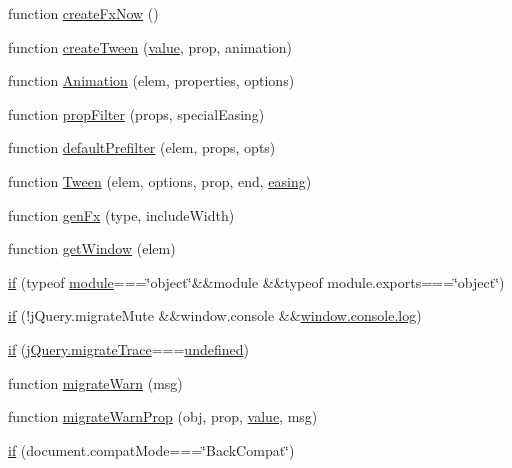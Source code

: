 \begin{DoxyCompactItemize}
function \hyperlink{jquery-1_8x_8js_a3c7bcef859b0811abb1dbf890c6cc635}{create\+Fx\+Now} ()
\item 
function \hyperlink{jquery-1_8x_8js_a0c2043fcd2fa684768877127fbbc2e55}{create\+Tween} (\hyperlink{jquery_8js_abe5393d870043cf6aaa1d5ad5fce755c}{value}, prop, animation)
\item 
function \hyperlink{jquery-1_8x_8js_aa33f7dcb8ee41587d545a0bc69849296}{Animation} (elem, properties, options)
\item 
function \hyperlink{jquery-1_8x_8js_a0196d1f08ae60b747901b5a2950f72f1}{prop\+Filter} (props, special\+Easing)
\item 
function \hyperlink{jquery-1_8x_8js_a8041b1040535dcee84ad474aaaf11dde}{default\+Prefilter} (elem, props, opts)
\item 
function \hyperlink{jquery-1_8x_8js_adcb517ce3709049d37bb5f5bd3811edf}{Tween} (elem, options, prop, end, \hyperlink{jquery-1_8x_8js_a9758a312629fa6de1744280dd6e6253b}{easing})
\item 
function \hyperlink{jquery-1_8x_8js_a0dad9ae6c57fd32a071de202faa87081}{gen\+Fx} (type, include\+Width)
\item 
function \hyperlink{jquery-1_8x_8js_ab8e6e1fb3b8b51b6afe437c63df0e09f}{get\+Window} (elem)
\item 
\hyperlink{jquery-1_8x_8js_aa2cebb51f03a2e3ab2af45a3f9241c96}{if} (typeof \hyperlink{classmodule}{module}===\char`\"{}object\char`\"{}\&\&module \&\&typeof module.\+exports===\char`\"{}object\char`\"{})
\item 
\hyperlink{jquery-1_8x_8js_ad10d0bcf3030078a7152ff4fb299cafd}{if} (!j\+Query.\+migrate\+Mute \&\&window.\+console \&\&\hyperlink{jquery-1_8x_8min_8js_aab8655c63335be4154bdc4165547623e}{window.\+console.\+log})
\item 
\hyperlink{jquery-1_8x_8js_a1c581eba65fdd637cf79589b2ed4b1bc}{if} (\hyperlink{jquery-1_8x_8min_8js_a6965eb7cecccff575d9c9b1a65e4623f}{j\+Query.\+migrate\+Trace}===\hyperlink{menu_2tpl_2js_2jquery_8tmpl_8js_a08113a236cc18d2a9d5ce27e638012be}{undefined})
\item 
function \hyperlink{jquery-1_8x_8js_ac6036b3100bb484f96bfb15165e077f9}{migrate\+Warn} (msg)
\item 
function \hyperlink{jquery-1_8x_8js_a8b7e87f655ec77e18e32e4847c8a1038}{migrate\+Warn\+Prop} (obj, prop, \hyperlink{jquery_8js_abe5393d870043cf6aaa1d5ad5fce755c}{value}, msg)
\item 
\hyperlink{jquery-1_8x_8js_ad54a877e9064a2054702ad5fcf92cc9b}{if} (document.\+compat\+Mode===\char`\"{}Back\+Compat\char`\"{})

\end{DoxyCompactItemize}
